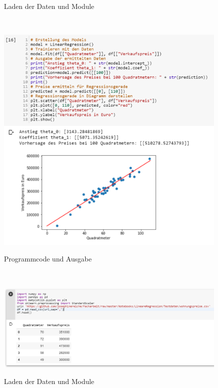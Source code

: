 \documentclass[a4paper]{scrreprt}
\begin{document}
\begin{enumerate}
\begin{figure}[hp]
\label{Konvexe Funktion}
\caption{Laden der Daten und Module}
\end{figure}\\
%
\begin{figure}[hp]
\centering
\includegraphics[scale=.75]{Abbildungen/Lineare_Regression_Python_2}
\label{Konvexe Funktion}
\caption{Programmcode und Ausgabe}
\end{figure}\\
%
\begin{figure}[hp]
\centering
\includegraphics[scale=.75]{Abbildungen/Lineare_Regression_Python_3}
\label{Konvexe Funktion}
\caption{Laden der Daten und Module}
\end{figure}\\
%
\begin{figure}[hp]
\centering

\end{figure}
\end{enumerate}
\end{document}
